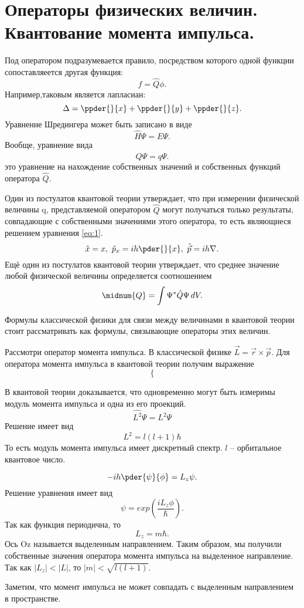 \chapter{Операторы физических величин. Квантование момента импульса.}

Под оператором подразумевается правило, посредством которого одной функции
сопоставляеется другая функция:
\[
    f = \hat{Q}\phi.
\]
Например,таковым является лапласиан:
\[
    \Delta = \ppder{}{x} + \ppder{}{y} + \ppder{}{z}.
\]
Уравнение Шредингера может быть записано в виде
\[
    \hat{H}\Psi = E\Psi.
\]
Вообще, уравнение вида
\begin{equation}
    \hat{Q}\Psi = q\Psi.
    \label{eq:1}    
\end{equation}
это уравнение на нахождение собственных значений и собственных функций оператора
\( \hat{Q} \).

Один из постулатов квантовой теории утверждает, что при измерении физической
величины q, представляемой оператором  \( \hat{Q} \) могут получаться только
результаты, совпадающие с собственными значениями этого оператора, то есть
являющиеся решением уравнения \ref{eq:1}.
\[
    \hat{x} = x,\ \hat{p}_x = ih\pder{}{x},\ \hat{\vec{p}} = ih\nabla. 
\]
Ещё один из постулатов квантовой теории утверждает, что среднее значение любой
физической величины определяется соотношением
\[
    \midnum{Q} = \int \Psi^*\hat{Q}\Psi\,dV.
\]

Формулы классической физики для связи между величинами в квантовой теории стоит
рассматривать как формулы, связывающие операторы этих величин.

Рассмотри оператор момента импульса. В классической физике
\( \vec{L} = \vec{r}\times\vec{p} \). Для оператора момента импульса в квантовой
теории получим выражение
\[
    \left\{\right.
\]

В квантовой теории доказывается, что одновременно могут быть измеримы модуль
момента импульса и одна из его проекций.
\[
    \hat{L^2}\Psi = L^2\Psi
\]
Решение имеет вид
\[
    L^2 = l(l+1)\hbar
\]
То есть модуль момента импульса имеет дискретный спектр. \( l \) -- орбитальное
квантовое число.

\[
    -ih\pder{\psi}{\phi} = L_z\psi.
\]
Решение уравнения имеет вид
\[
    \psi = exp(\frac{iL_z\phi}{\hbar}).
\]
Так как функция периодична, то
\[
    L_z = m\hbar.
\]
Ось Oz  называется выделенным направлением. Таким образом, мы получили
собственные значения оператора момента импульса на выделенное направление.
Так как \( |L_z| < |L| \), то \( |m| < \sqrt{l(l+1)} \).

Заметим, что момент импульса не может совпадать с выделенным направлением в
пространстве.

\newpage
